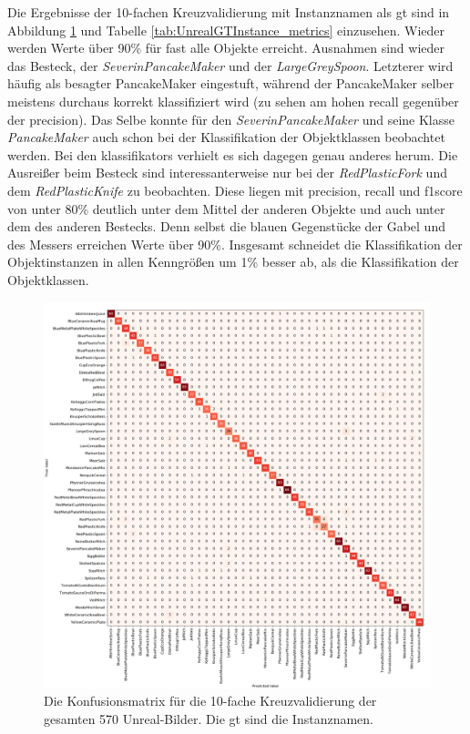 Die Ergebnisse der 10-fachen Kreuzvalidierung mit Instanznamen als \gls{gt} sind in Abbildung \ref{fig:UnrealGTInstance_confMatrix} und Tabelle \ref{tab:UnrealGTInstance_metrics} einzusehen. Wieder werden Werte über 90\% für fast alle Objekte erreicht. Ausnahmen sind wieder das Besteck, der \textit{SeverinPancakeMaker} und der \textit{LargeGreySpoon}. Letzterer wird häufig als besagter PancakeMaker eingestuft, während der PancakeMaker selber meistens durchaus korrekt klassifiziert wird (zu sehen am hohen \gls{recall} gegenüber der \gls{precision}). Das Selbe konnte für den \textit{SeverinPancakeMaker} und seine Klasse \textit{PancakeMaker} auch schon bei der Klassifikation der Objektklassen beobachtet werden. Bei den \glspl{klassifikator} verhielt es sich dagegen genau anderes herum. Die Ausreißer beim Besteck sind interessanterweise nur bei der \textit{RedPlasticFork} und dem \textit{RedPlasticKnife} zu beobachten. Diese liegen mit \gls{precision}, \gls{recall} und \gls{f1score} von unter 80\% deutlich unter dem Mittel der anderen Objekte und auch unter dem des anderen Bestecks. Denn selbst die blauen Gegenstücke der Gabel und des Messers erreichen Werte über 90\%. Insgesamt schneidet die Klassifikation der Objektinstanzen in allen Kenngrößen um 1\% besser ab, als die Klassifikation der Objektklassen.

\begin{figure}
\centering
	\includegraphics[scale=.3]{img/chapter6/UnrealGTInstance.png}
\caption[Konfusionsmatrix des gesamten Unreal-Bilder Datensatzes mit den Instanznamen als GT]{Die Konfusionsmatrix für die 10-fache Kreuzvalidierung der gesamten 570 Unreal-Bilder. Die \gls{gt} sind die Instanznamen.}
\label{fig:UnrealGTInstance_confMatrix}
\end{figure}

